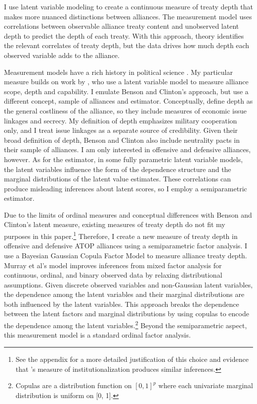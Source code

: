 \documentclass[12pt]{article}
\begin{document}
 
I use latent variable modeling to create a continuous measure of treaty depth that makes more nuanced distinctions between alliances.
The measurement model uses correlations between observable alliance treaty content and unobserved latent depth to predict the depth of each treaty. 
With this approach, theory identifies the relevant correlates of treaty depth, but the data drives how much depth each observed variable adds to the alliance. 


Measurement models have a rich history in political science \citep{Clintonetal2004, TreierJackman2008, Fariss2014}.
My particular measure builds on work by \citet{BensonClinton2016}, who use a latent variable model \citep{Quinn2004} to measure alliance scope, depth and capability.  
I emulate Benson and Clinton's approach, but use a different concept, sample of alliances and estimator. 
Conceptually, \citet{BensonClinton2016} define depth as the general costliness of the alliance, so they include measures of economic issue linkages and secrecy.
My definition of depth emphasizes military cooperation only, and I treat issue linkages as a separate source of credibility. 
Given their broad definition of depth, Benson and Clinton also include neutrality pacts in their sample of alliances.
I am only interested in offensive and defensive alliances, however.  
As for the estimator, in some fully parametric latent variable models, the latent variables influence the form of the dependence structure and the marginal distributions of the latent value estimates. 
These correlations can produce misleading inferences about latent scores, so I employ a semiparametric estimator.


Due to the limits of ordinal measures and conceptual differences with Benson and Clinton's latent measure, existing measures of treaty depth do not fit my purposes in this paper.\footnote{See the appendix for a more detailed justification of this choice and evidence that \citet{LeedsAnac2005}'s measure of institutionalization produces similar inferences.}
Therefore, I create a new measure of treaty depth in offensive and defensive ATOP alliances using a semiparametric factor analysis. 
I use a Bayesian Gaussian Copula Factor Model \citep{Murrayetal2013} to measure alliance treaty depth. 
Murray et al's model improves inferences from mixed factor analysis for continuous, ordinal, and binary observed data by relaxing distributional assumptions.
Given discrete observed variables and non-Gaussian latent variables, the dependence among the latent variables and their marginal distributions are both influenced by the latent variables.
This approach breaks the dependence between the latent factors and marginal distributions by using copulas to encode the dependence among the latent variables.\footnote{Copulas are a distribution function on $[0, 1]^p$ where each univariate marginal distribution is uniform on [0, 1].}
Beyond the semiparametric aspect, this measurement model is a standard ordinal factor analysis.
\end{document}
